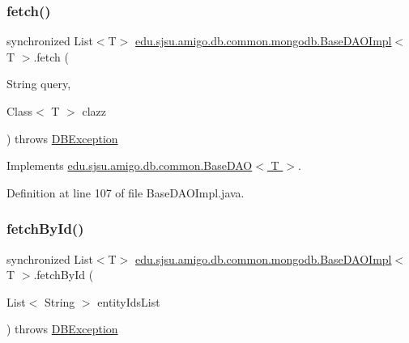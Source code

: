 \subsubsection{\texorpdfstring{fetch()}{fetch()}}
{\footnotesize\ttfamily synchronized List$<$T$>$ \hyperlink{classedu_1_1sjsu_1_1amigo_1_1db_1_1common_1_1mongodb_1_1_base_d_a_o_impl}{edu.\+sjsu.\+amigo.\+db.\+common.\+mongodb.\+Base\+D\+A\+O\+Impl}$<$ T $>$.fetch (\begin{DoxyParamCaption}\item[{String}]{query,  }\item[{Class$<$ T $>$}]{clazz }\end{DoxyParamCaption}) throws \hyperlink{classedu_1_1sjsu_1_1amigo_1_1db_1_1common_1_1_d_b_exception}{D\+B\+Exception}}



Implements \hyperlink{interfaceedu_1_1sjsu_1_1amigo_1_1db_1_1common_1_1_base_d_a_o_acae47af1542a0d62e801ef3a458876e0}{edu.\+sjsu.\+amigo.\+db.\+common.\+Base\+D\+A\+O$<$ T $>$}.



Definition at line 107 of file Base\+D\+A\+O\+Impl.\+java.

\mbox{\label{classedu_1_1sjsu_1_1amigo_1_1db_1_1common_1_1mongodb_1_1_base_d_a_o_impl_a0f44ed7ba8e92fa387be39194177e4cf}} 
\subsubsection{\texorpdfstring{fetch\+By\+Id()}{fetchById()}}
{\footnotesize\ttfamily synchronized List$<$T$>$ \hyperlink{classedu_1_1sjsu_1_1amigo_1_1db_1_1common_1_1mongodb_1_1_base_d_a_o_impl}{edu.\+sjsu.\+amigo.\+db.\+common.\+mongodb.\+Base\+D\+A\+O\+Impl}$<$ T $>$.fetch\+By\+Id (\begin{DoxyParamCaption}\item[{List$<$ String $>$}]{entity\+Ids\+List }\end{DoxyParamCaption}) throws \hyperlink{classedu_1_1sjsu_1_1amigo_1_1db_1_1common_1_1_d_b_exception}{D\+B\+Exception}}



